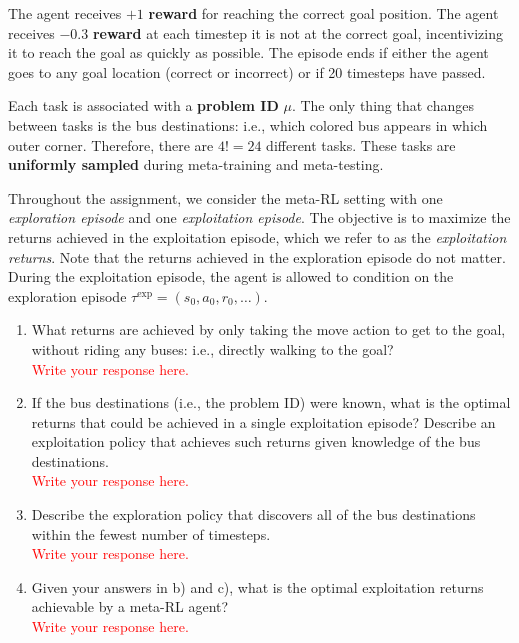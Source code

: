\documentclass[12pt]{article}
\begin{document}
The agent receives $+1$ \textbf{reward} for reaching the correct goal position.
The agent receives $-0.3$ \textbf{reward} at each timestep it is not at the correct goal, incentivizing it to reach the goal as quickly as possible.
The episode ends if either the agent goes to any goal location (correct or incorrect) or if 20 timesteps have passed.

Each task is associated with a \textbf{problem ID} $\mu$. The only thing that changes between tasks is the bus destinations: i.e., which colored bus appears in which outer corner. Therefore, there are $4! = 24$ different tasks. These tasks are \textbf{uniformly sampled} during meta-training and meta-testing.

Throughout the assignment, we consider the meta-RL setting with one \emph{exploration episode} and one \emph{exploitation episode}.
The objective is to maximize the returns achieved in the exploitation episode, which we refer to as the \emph{exploitation returns}.
Note that the returns achieved in the exploration episode do not matter.
During the exploitation episode, the agent is allowed to condition on the exploration episode $\tau^\text{exp} = (s_0, a_0, r_0, \ldots)$.

\begin{enumerate}[label=\alph*)]
    \item What returns are achieved by only taking the move action to get to the goal, without riding any buses: i.e., directly walking to the goal? \\
    \textcolor{red}{Write your response here.}
    \item If the bus destinations (i.e., the problem ID) were known, what is the optimal returns that could be achieved in a single exploitation episode? Describe an exploitation policy that achieves such returns given knowledge of the bus destinations. \\
    \textcolor{red}{Write your response here.}
    \item Describe the exploration policy that discovers all of the bus destinations within the fewest number of timesteps. \\
    \textcolor{red}{Write your response here.}
    \item Given your answers in b) and c), what is the optimal exploitation returns achievable by a meta-RL agent? \\
    \textcolor{red}{Write your response here.}
\end{enumerate}
\end{document}
